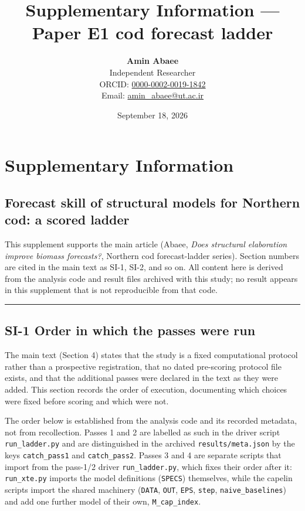 \documentclass[11pt]{article}
\title{Supplementary Information — Paper E1 cod forecast ladder}
\author{\textbf{Amin Abaee}\\ Independent Researcher\\[2pt] ORCID: \href{https://orcid.org/0000-0002-0019-1842}{0000-0002-0019-1842}\\ Email: \href{mailto:amin_abaee@ut.ac.ir}{amin_abaee@ut.ac.ir}}
\date{September 18, 2026}
\begin{document}
\maketitle

\section{Supplementary Information}\label{supplementary-information}

\subsection{Forecast skill of structural models for Northern cod: a
scored
ladder}\label{forecast-skill-of-structural-models-for-northern-cod-a-scored-ladder}

This supplement supports the main article (Abaee, \emph{Does structural
elaboration improve biomass forecasts?}, Northern cod forecast-ladder
series). Section numbers are cited in the main text as SI-1, SI-2, and
so on. All content here is derived from the analysis code and result
files archived with this study; no result appears in this supplement
that is not reproducible from that code.

\begin{center}\rule{0.5\linewidth}{0.5pt}\end{center}

\subsection{SI-1 Order in which the passes were
run}\label{si-1-order-in-which-the-passes-were-run}

The main text (Section 4) states that the study is a fixed computational
protocol rather than a prospective registration, that no dated
pre-scoring protocol file exists, and that the additional passes were
declared in the text as they were added. This section records the order
of execution, documenting which choices were fixed before scoring and
which were not.

The order below is established from the analysis code and its recorded
metadata, not from recollection. Passes 1 and 2 are labelled as such in
the driver script \texttt{run\_ladder.py} and are distinguished in the
archived \texttt{results/meta.json} by the keys \texttt{catch\_pass1}
and \texttt{catch\_pass2}. Passes 3 and 4 are separate scripts that
import from the pass-1/2 driver \texttt{run\_ladder.py}, which fixes
their order after it: \texttt{run\_xte.py} imports the model definitions
(\texttt{SPECS}) themselves, while the capelin scripts import the shared
machinery (\texttt{DATA}, \texttt{OUT}, \texttt{EPS}, \texttt{step},
\texttt{naive\_baselines}) and add one further model of their own,
\texttt{M\_cap\_index}.
\end{document}
